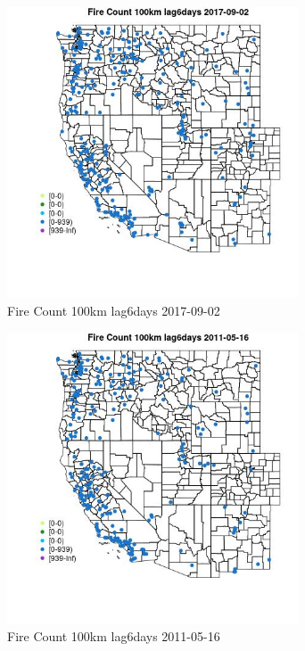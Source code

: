 \begin{figure} 
\centering  
\includegraphics[width=0.77\textwidth]{Code_Outputs/Report_ML_input_PM25_Step4_part_e_de_duplicated_aves_compiled_2019-05-20wNAs_MapObsFire_Count_100km_lag6days2017-09-02.jpg} 
\caption{\label{fig:Report_ML_input_PM25_Step4_part_e_de_duplicated_aves_compiled_2019-05-20wNAsMapObsFire_Count_100km_lag6days2017-09-02}Fire Count 100km lag6days 2017-09-02} 
\end{figure} 
 

\begin{figure} 
\centering  
\includegraphics[width=0.77\textwidth]{Code_Outputs/Report_ML_input_PM25_Step4_part_e_de_duplicated_aves_compiled_2019-05-20wNAs_MapObsFire_Count_100km_lag6days2011-05-16.jpg} 
\caption{\label{fig:Report_ML_input_PM25_Step4_part_e_de_duplicated_aves_compiled_2019-05-20wNAsMapObsFire_Count_100km_lag6days2011-05-16}Fire Count 100km lag6days 2011-05-16} 
\end{figure} 
 


